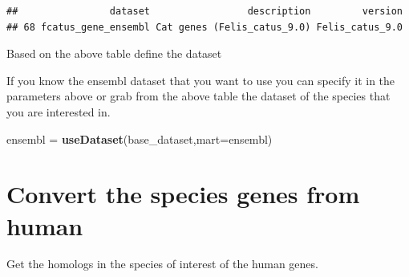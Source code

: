 \documentclass[
]{book}
\newenvironment{Shaded}{\begin{snugshade}}{\end{snugshade}}
\newcommand{\AttributeTok}[1]{\textcolor[rgb]{0.13,0.29,0.53}{#1}}
\newcommand{\CommentTok}[1]{\textcolor[rgb]{0.56,0.35,0.01}{\textit{#1}}}
\newcommand{\ConstantTok}[1]{\textcolor[rgb]{0.56,0.35,0.01}{#1}}
\newcommand{\FunctionTok}[1]{\textcolor[rgb]{0.13,0.29,0.53}{\textbf{#1}}}
\newcommand{\NormalTok}[1]{#1}
\newcommand{\OtherTok}[1]{\textcolor[rgb]{0.56,0.35,0.01}{#1}}
\newcommand{\SpecialCharTok}[1]{\textcolor[rgb]{0.81,0.36,0.00}{\textbf{#1}}}
\newcommand{\StringTok}[1]{\textcolor[rgb]{0.31,0.60,0.02}{#1}}
\begin{document}
\begin{verbatim}
##                dataset                 description         version
## 68 fcatus_gene_ensembl Cat genes (Felis_catus_9.0) Felis_catus_9.0
\end{verbatim}

Based on the above table define the dataset

\begin{Shaded}
\end{Shaded}

If you know the ensembl dataset that you want to use you can specify it in the parameters above or grab from the above table the dataset of the species that you are interested in.

\begin{Shaded}
\begin{Highlighting}[]
\NormalTok{ensembl }\OtherTok{=} \FunctionTok{useDataset}\NormalTok{(base\_dataset,}\AttributeTok{mart=}\NormalTok{ensembl)}
\end{Highlighting}
\end{Shaded}

\hypertarget{convert-the-species-genes-from-human}{%
\section{Convert the species genes from human}\label{convert-the-species-genes-from-human}}

Get the homologs in the species of interest of the human genes.
\end{document}
